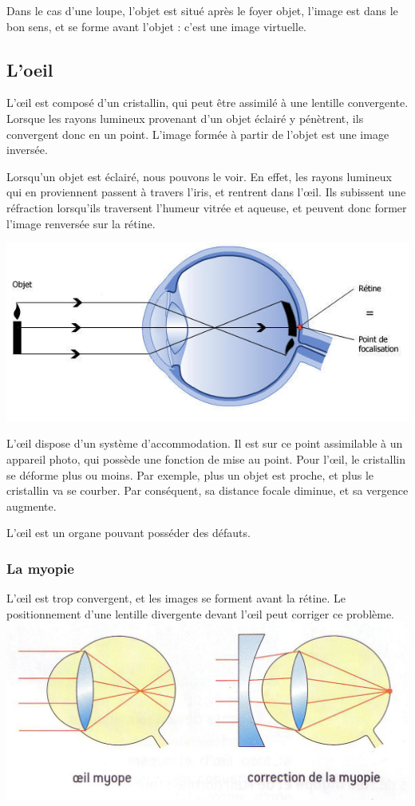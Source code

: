 \documentclass[a4paper, 12pt, onecolumn, openany]{report}
\begin{document}
	Dans le cas d’une loupe, l’objet est situé après le foyer objet, l’image est dans le bon sens, et se forme avant l’objet : c’est une image virtuelle.

\newpage
		\subsection{L'oeil}
		L’œil est composé d’un cristallin, qui peut être assimilé à une lentille convergente. Lorsque les rayons lumineux provenant d’un objet éclairé y pénètrent, ils convergent donc en un point. L’image formée à partir de l’objet est une image inversée.
		
		Lorsqu’un objet est éclairé, nous pouvons le voir. En effet, les rayons lumineux qui en proviennent passent à travers l’iris, et rentrent dans l’œil. Ils subissent une réfraction lorsqu’ils traversent l’humeur vitrée et aqueuse, et peuvent donc former l’image renversée sur la rétine.
		
	\includegraphics[scale=0.2]{rayons_lumineux.jpg}
		
	L’œil dispose d’un système d’accommodation. Il est sur ce point assimilable à un appareil photo, qui possède une fonction de mise au point. Pour l’œil, le cristallin se déforme plus ou moins. Par exemple, plus un objet est proche, et plus le cristallin va se courber. Par conséquent, sa distance focale diminue, et sa vergence augmente. 

	L’œil est un organe pouvant posséder des défauts.

	\subsubsection{La myopie}
	L’œil est trop convergent, et les images se forment avant la rétine. Le positionnement d’une lentille divergente devant l’œil peut corriger ce problème.
	\includegraphics{myopie.jpg}
	
\end{document}
